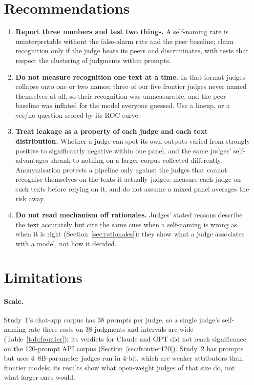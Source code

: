\section{Recommendations}
\label{sec:recs}

\begin{enumerate}
\item \textbf{Report three numbers and test two things.} A self-naming rate
is uninterpretable without the false-alarm rate and the peer baseline; claim
recognition only if the judge beats its peers and discriminates, with tests
that respect the clustering of judgments within prompts.
\item \textbf{Do not measure recognition one text at a time.} In that format
judges collapse onto one or two names; three of our five frontier judges
never named themselves at all, so their recognition was unmeasurable, and
the peer baseline was inflated for the model everyone guessed. Use a lineup,
or a yes/no question scored by its ROC curve.
\item \textbf{Treat leakage as a property of each judge and each text
distribution.} Whether a judge can spot its own outputs varied from strongly
positive to significantly negative within one panel, and the same judges'
self-advantages shrank to nothing on a larger corpus collected differently.
Anonymisation protects a pipeline only against the judges that cannot
recognise themselves on the texts it actually judges; measure each judge on
such texts before relying on it, and do not assume a mixed panel averages the
risk away.
\item \textbf{Do not read mechanism off rationales.} Judges' stated reasons
describe the text accurately but cite the same cues when a self-naming is
wrong as when it is right (Section~\ref{sec:rationales}): they show what a
judge associates with a model, not how it decided.
\end{enumerate}

\section{Limitations}
\label{sec:limits}

\paragraph{Scale.} Study~1's chat-app corpus has 38 prompts per judge, so a
single judge's self-naming rate there rests on 38 judgments and intervals are
wide (Table~\ref{tab:frontier}); its verdicts for Claude and GPT did not
reach significance on the 120-prompt API corpus (Section~\ref{sec:frontier120}). Study~2 has \OWNPrompts{} prompts but uses
4--8B-parameter judges run in 4-bit, which are weaker attributors than
frontier models; its results show what open-weight judges of that size do,
not what larger ones would.

